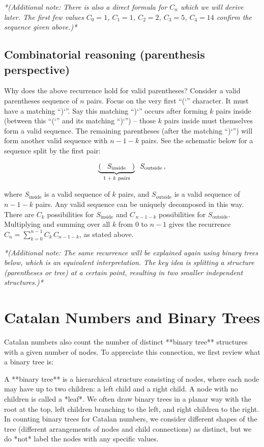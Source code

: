 \documentclass[docmute]{article}
\begin{document}
\textit{*(Additional note: There is also a direct formula for $C_n$ which we will derive later. The first few values $C_0=1$, $C_1=1$, $C_2=2$, $C_3=5$, $C_4=14$ confirm the sequence given above.)*}

\subsection*{Combinatorial reasoning (parenthesis perspective)}

Why does the above recurrence hold for valid parentheses? Consider a valid parentheses sequence of $n$ pairs. Focus on the very first “(`” character. It must have a matching “)`”. Say this matching “)`” occurs after forming $k$ pairs inside (between this “(`” and its matching “)`”) – those $k$ pairs inside must themselves form a valid sequence. The remaining parentheses (after the matching “)`”) will form another valid sequence with $n-1-k$ pairs. See the schematic below for a sequence split by the first pair:

\[
\underbrace{\vphantom{()}( \;\;\; S_{\text{inside}} \;\;\; )}_{\text{$1+k$ pairs}} \;\; S_{\text{outside}}\,,
\] 

where $S_{\text{inside}}$ is a valid sequence of $k$ pairs, and $S_{\text{outside}}$ is a valid sequence of $n-1-k$ pairs. Any valid sequence can be uniquely decomposed in this way. There are $C_k$ possibilities for $S_{\text{inside}}$ and $C_{\,n-1-k}$ possibilities for $S_{\text{outside}}$. Multiplying and summing over all $k$ from $0$ to $n-1$ gives the recurrence $C_n = \sum_{k=0}^{n-1} C_k\,C_{n-1-k}$, as stated above.

\textit{*(Additional note: The same recurrence will be explained again using binary trees below, which is an equivalent interpretation. The key idea is splitting a structure (parentheses or tree) at a certain point, resulting in two smaller independent structures.)*}

\section{Catalan Numbers and Binary Trees}

Catalan numbers also count the number of distinct **binary tree** structures with a given number of nodes. To appreciate this connection, we first review what a binary tree is:

A **binary tree** is a hierarchical structure consisting of nodes, where each node may have up to two children: a left child and a right child. A node with no children is called a *leaf*. We often draw binary trees in a planar way with the root at the top, left children branching to the left, and right children to the right. In counting binary trees for Catalan numbers, we consider different shapes of the tree (different arrangements of nodes and child connections) as distinct, but we do *not* label the nodes with any specific values.
\end{document}
